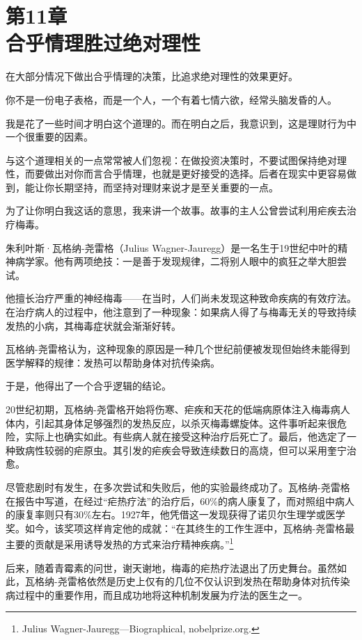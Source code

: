 
\section[第11章\q 合乎情理胜过绝对理性]{第11章\\ 合乎情理胜过绝对理性}

{\kaishu

在大部分情况下做出合乎情理的决策，比追求绝对理性的效果更好。

}

你不是一份电子表格，而是一个人，一个有着七情六欲，经常头脑发昏的人。

我是花了一些时间才明白这个道理的。而在明白之后，我意识到，这是理财行为中一个很重要的因素。

与这个道理相关的一点常常被人们忽视：在做投资决策时，不要试图保持绝对理性，而要做出对你而言合乎情理，也就是更好接受的选择。后者在现实中更容易做到，能让你长期坚持，而坚持对理财来说才是至关重要的一点。

为了让你明白我这话的意思，我来讲一个故事。故事的主人公曾尝试利用疟疾去治疗梅毒。

朱利叶斯·瓦格纳-尧雷格（Julius Wagner-Jauregg）是一名生于19世纪中叶的精神病学家。他有两项绝技：一是善于发现规律，二将别人眼中的疯狂之举大胆尝试。

他擅长治疗严重的神经梅毒——在当时，人们尚未发现这种致命疾病的有效疗法。在治疗病人的过程中，他注意到了一种现象：如果病人得了与梅毒无关的导致持续发热的小病，其梅毒症状就会渐渐好转。

瓦格纳-尧雷格认为，这种现象的原因是一种几个世纪前便被发现但始终未能得到医学解释的规律：发热可以帮助身体对抗传染病。

于是，他得出了一个合乎逻辑的结论。

20世纪初期，瓦格纳-尧雷格开始将伤寒、疟疾和天花的低端病原体注入梅毒病人体内，引起其身体足够强烈的发热反应，以杀灭梅毒螺旋体。这件事听起来很危险，实际上也确实如此。有些病人就在接受这种治疗后死亡了。最后，他选定了一种致病性较弱的疟原虫。其引发的疟疾会导致连续数日的高烧，但可以采用奎宁治愈。

尽管悲剧时有发生，在多次尝试和失败后，他的实验最终成功了。瓦格纳-尧雷格在报告中写道，在经过“疟热疗法”的治疗后，60\%的病人康复了，而对照组中病人的康复率则只有30\%左右。1927年，他凭借这一发现获得了诺贝尔生理学或医学奖。如今，该奖项这样肯定他的成就：“在其终生的工作生涯中，瓦格纳-尧雷格最主要的贡献是采用诱导发热的方式来治疗精神疾病。”\footnote{Julius Wagner-Jauregg—Biographical, nobelprize.org.}

后来，随着青霉素的问世，谢天谢地，梅毒的疟热疗法退出了历史舞台。虽然如此，瓦格纳-尧雷格依然是历史上仅有的几位不仅认识到发热在帮助身体对抗传染病过程中的重要作用，而且成功地将这种机制发展为疗法的医生之一。

